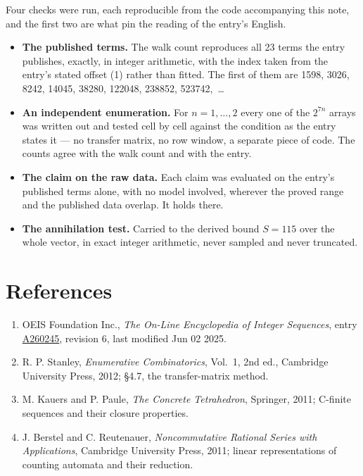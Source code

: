 \documentclass[11pt]{article}
\theoremstyle{definition}
\begin{document}
Four checks were run, each reproducible from the code accompanying this note, and the first two are what pin the reading of the entry's English.

\begin{itemize}

\item {\bfseries The published terms.} The walk count reproduces all 23 terms the entry publishes, exactly, in integer arithmetic, with the index taken from the entry's stated offset (1) rather than fitted. The first of them are 1598, 3026, 8242, 14045, 38280, 122048, 238852, 523742,~\dots

\item {\bfseries An independent enumeration.} For $n = 1,\dots,2$ every one of the $2^{7n}$ arrays was written out and tested cell by cell against the condition as the entry states it --- no transfer matrix, no row window, a separate piece of code. The counts agree with the walk count and with the entry.

\item {\bfseries The claim on the raw data.} Each claim was evaluated on the entry's published terms alone, with no model involved, wherever the proved range and the published data overlap. It holds there.

\item {\bfseries The annihilation test.} Carried to the derived bound $S = 115$ over the whole vector, in exact integer arithmetic, never sampled and never truncated.

\end{itemize}

\section{References}

\begin{enumerate}

\item OEIS Foundation Inc., \emph{The On-Line Encyclopedia of Integer Sequences}, entry \href{https://oeis.org/A260245}{A260245}, revision 6, last modified Jun 02 2025.

\item R. P. Stanley, \emph{Enumerative Combinatorics}, Vol.~1, 2nd ed., Cambridge University Press, 2012; \S4.7, the transfer-matrix method.

\item M. Kauers and P. Paule, \emph{The Concrete Tetrahedron}, Springer, 2011; C-finite sequences and their closure properties.

\item J. Berstel and C. Reutenauer, \emph{Noncommutative Rational Series with Applications}, Cambridge University Press, 2011; linear representations of counting automata and their reduction.

\end{enumerate}
\end{document}
